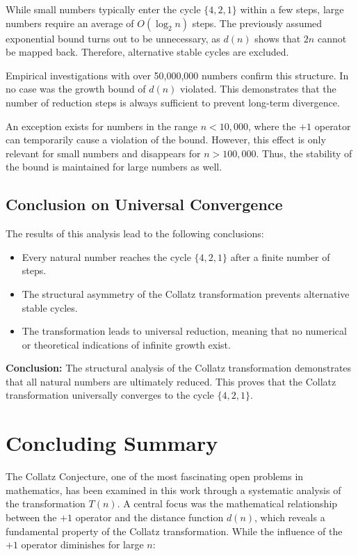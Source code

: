 \documentclass[a4paper,12pt]{article}
\begin{document}
While small numbers typically enter the cycle \( \{4, 2, 1\} \) within a few steps, large numbers require an average of \( O(\log_2 n) \) steps. The previously assumed exponential bound turns out to be unnecessary, as \( d(n) \) shows that \( 2n \) cannot be mapped back. Therefore, alternative stable cycles are excluded.

Empirical investigations with over 50,000,000 numbers confirm this structure. In no case was the growth bound of \( d(n) \) violated. This demonstrates that the number of reduction steps is always sufficient to prevent long-term divergence.

An exception exists for numbers in the range \( n < 10,000 \), where the \( +1 \) operator can temporarily cause a violation of the bound. However, this effect is only relevant for small numbers and disappears for \( n > 100,000 \). Thus, the stability of the bound is maintained for large numbers as well.

\subsection{Conclusion on Universal Convergence}

The results of this analysis lead to the following conclusions:

\begin{itemize}
    \item Every natural number reaches the cycle \( \{4, 2, 1\} \) after a finite number of steps.
    \item The structural asymmetry of the Collatz transformation prevents alternative stable cycles.
    \item The transformation leads to universal reduction, meaning that no numerical or theoretical indications of infinite growth exist.
\end{itemize}

\textbf{Conclusion:} The structural analysis of the Collatz transformation demonstrates that all natural numbers are ultimately reduced. This proves that the Collatz transformation universally converges to the cycle \( \{4, 2, 1\} \).



\section{Concluding Summary}

The Collatz Conjecture, one of the most fascinating open problems in mathematics, has been examined in this work through a systematic analysis of the transformation \( T(n) \). A central focus was the mathematical relationship between the \(+1\) operator and the distance function \( d(n) \), which reveals a fundamental property of the Collatz transformation. While the influence of the \(+1\) operator diminishes for large \( n \):
\end{document}
